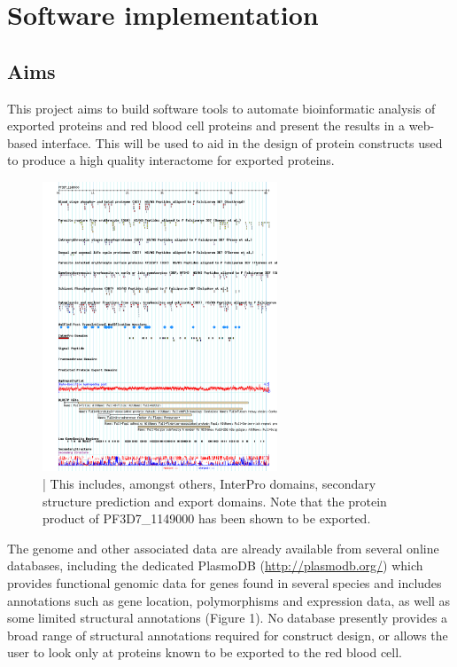 \documentclass[fleqn,10pt]{article} %
\begin{document}
\section{Software implementation}
\subsection{Aims}

This project aims to build software tools to automate bioinformatic analysis of \pf exported proteins and red blood cell proteins and present the results in a web-based interface. This will be used to aid in the design of protein constructs used to produce a high quality interactome for exported \pf proteins. 


\begin{figure}
\includegraphics[width=7cm]{figs/plasmodbview}
\caption{ | This includes, amongst others, InterPro domains, secondary structure prediction and export domains. Note that the protein product of PF3D7\_1149000 has been shown to be exported.}
\end{figure}

The \pf genome and other associated data are already available from several online databases, including the dedicated PlasmoDB (\url{http://plasmodb.org/}) \cite{Aurrecoechea2009} which provides functional genomic data for genes found in several  species and includes annotations such as gene location, polymorphisms and expression data, as well as some limited structural annotations (Figure 1). No database presently provides a broad range of structural annotations required for construct design, or allows the user to look only at proteins known to be exported to the red blood cell.
\end{document}

